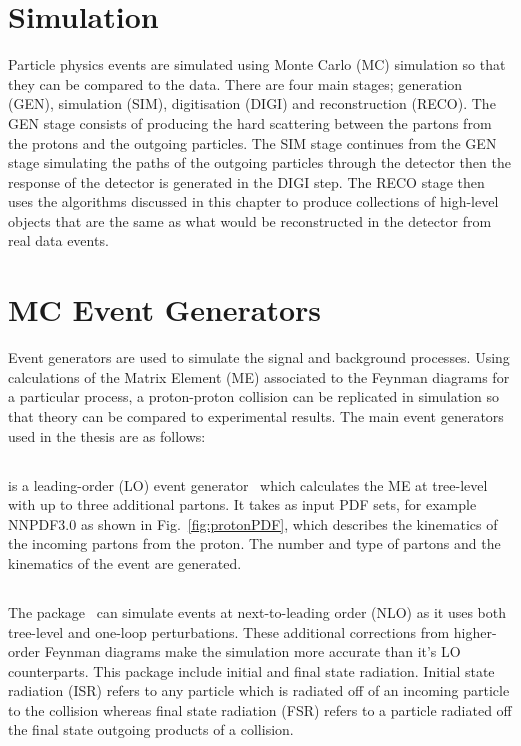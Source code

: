 \section{Simulation}
Particle physics events are simulated using Monte Carlo (MC) simulation so that they can be compared to the data. There are four main stages; generation (GEN), simulation (SIM), digitisation (DIGI) and reconstruction (RECO). The GEN stage consists of producing the hard scattering between the partons from the protons and the outgoing particles. The SIM stage continues from the GEN stage simulating the paths of the outgoing particles through the detector then the response of the detector is generated in the DIGI step. The RECO stage then uses the algorithms discussed in this chapter to produce collections of high-level objects that are the same as what would be reconstructed in the detector from real data events.

\section{MC Event Generators}

Event generators are used to simulate the signal and background processes. Using calculations of the Matrix Element (ME) associated to the Feynman diagrams for a particular process, a proton-proton collision can be replicated in simulation so that theory can be compared to experimental results. The main event generators used in the thesis are as follows:

\subsection{\MADGRAPH}
\MADGRAPH is a leading-order (LO) event generator~\cite{Alwall2011} which calculates the ME at tree-level with up to three additional partons. It takes as input PDF sets, for example NNPDF3.0 as shown in Fig.~\ref{fig:protonPDF}, which describes the kinematics of the incoming partons from the proton. The number and type of partons and the kinematics of the event are generated.
\subsection{\aMCATNLO}
The \aMCATNLO package~\cite{Degrande:2014sta} can simulate events at next-to-leading order (NLO) as it uses both tree-level and one-loop perturbations. These additional corrections from higher-order Feynman diagrams make the simulation more accurate than it's LO counterparts. This package include initial and final state radiation. Initial state radiation (ISR) refers to any particle which is radiated off of an incoming particle to the collision whereas final state radiation (FSR) refers to a particle radiated off the final state outgoing products of a collision.\\
